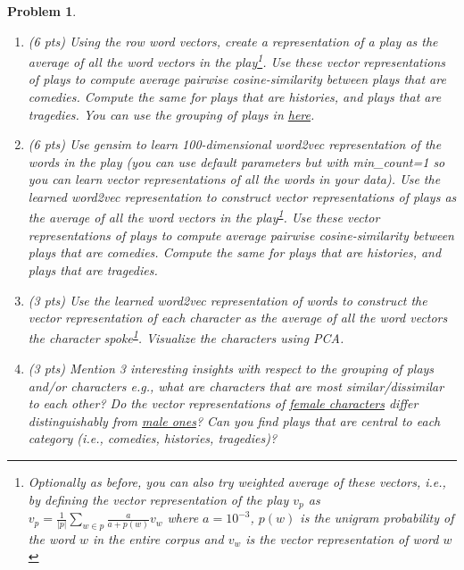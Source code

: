 \documentclass{article}
\newtheorem{problem}{Problem}
\begin{document}
\begin{problem}
\begin{enumerate}
    \item (6 pts) Using the row word vectors, create a representation of a play as the average of all the word vectors in the play\footnote{\label{note2}Optionally as before, you can also try weighted average of these vectors, i.e., by defining the vector representation of the play $v_p$ as $v_p = \frac{1}{|p|} \sum_{w \in p} \frac{a}{a+p(w)} v_w$ where $a=10^{-3}$, $p(w)$ is the unigram probability of the word $w$ in the entire corpus and $v_w$ is the vector representation of word $w$}. Use these vector representations of plays to compute average pairwise cosine-similarity between plays that are comedies. Compute the same for plays that are histories, and plays that are tragedies. You can use the grouping of plays in \href{https://en.wikipedia.org/wiki/Shakespeare\%27s_plays#Canonical_plays}{here}. 
    \item (6 pts) Use gensim to learn 100-dimensional word2vec representation of the words in the play (you can use default parameters but with min\_count=1 so you can learn vector representations of all the words in your data). Use the learned word2vec representation to construct vector representations of plays as the average of all the word vectors in the play\textsuperscript{\ref{note2}}. Use these vector representations of plays to compute average pairwise cosine-similarity between plays that are comedies. Compute the same for plays that are histories, and plays that are tragedies. 
    \item (3 pts) Use the learned word2vec representation of words to construct the vector representation of each character as the average of all the word vectors the character spoke\textsuperscript{\ref{note2}}. Visualize the characters using PCA. 
    \item (3 pts) Mention 3 interesting insights with respect to the grouping of plays and/or characters e.g., what are characters that are most similar/dissimilar to each other? Do the vector representations of \href{https://en.wikipedia.org/wiki/Category:Female_Shakespearean_characters}{female characters} differ distinguishably from \href{https://en.wikipedia.org/wiki/Category:Male_Shakespearean_characters}{male ones}? Can you find plays that are central to each category (i.e., comedies, histories, tragedies)?
\end{enumerate}
\end{problem}
\end{document}
